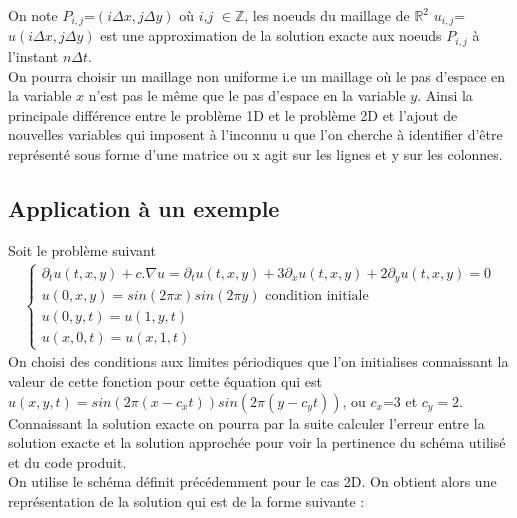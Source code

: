 \documentclass[12pt]{article}
\begin{document}
On note $P_{i,j}$=$(i \Delta x,j \Delta y)$ où $i$,$j$ $\in\mathbb{Z}$, les noeuds du maillage de $\mathbb{R}^2$  $u_{i,j}$=$u(i \Delta x,j \Delta y)$ est une approximation de la solution exacte aux noeuds $P_{i,j}$ à l'instant $n\Delta t$.
\\On pourra choisir un maillage non uniforme i.e un maillage où le pas d'espace en la variable $x$ n'est pas le même que le pas d'espace en la variable $y$.
Ainsi la principale différence entre le problème 1D et le problème 2D et l'ajout de nouvelles variables qui imposent à l'inconnu u que l'on cherche à identifier d'être représenté sous forme d'une matrice ou x agit sur les lignes et y sur les colonnes.
\subsection{Application à un exemple}
Soit le problème suivant
\begin{eqnarray*}
      \left\{
        \begin{array}{llll}
            \partial_tu(t,x,y)+c.\nabla u=\partial_tu(t,x,y) +3\partial_xu(t,x,y)+2\partial_yu(t,x,y)=0
            \\ u(0,x,y)=sin(2\pi x)sin(2\pi y) \text{ condition initiale}
            \\u(0,y,t)=u(1,y,t)
            \\u(x,0,t)=u(x,1,t)
        \end{array}
    \right .
\end{eqnarray*}
On choisi des conditions aux limites périodiques que l'on initialises connaissant la valeur de cette fonction pour cette équation qui est $u(x,y,t)=sin(2\pi (x-c_xt))sin(2\pi(y-c_yt))$, ou $c_x$=3 et $c_y=2$.
Connaissant la solution exacte on pourra par la suite calculer l'erreur entre la solution exacte et la solution approchée pour voir la pertinence du schéma utilisé et du code produit.
\\On utilise le schéma définit précédemment pour le cas 2D. On obtient alors une représentation de la solution qui est de la forme suivante :
\end{document}
